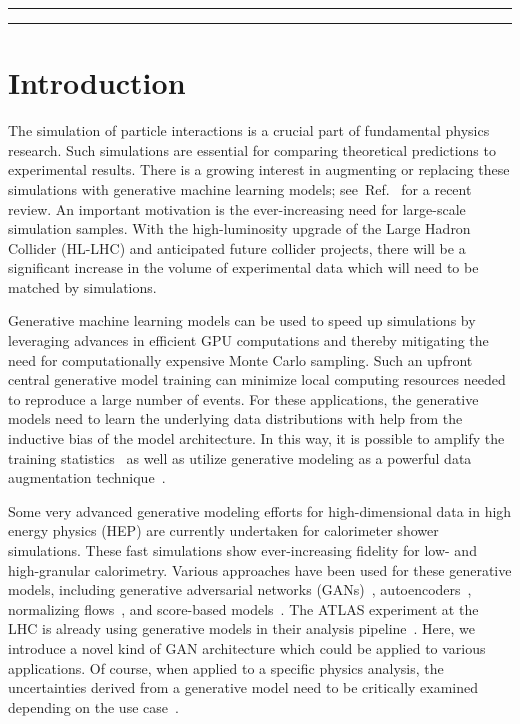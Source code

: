 \documentclass[a4paper,submission, Phys]{SciPost}
\DeclareRobustCommand{\Reff}[1]{Ref.~\cite{#1}}
\begin{document}
\vspace{10pt}
\noindent\rule{\textwidth}{1pt}
\setcounter{tocdepth}{2} 
\tableofcontents\thispagestyle{fancy}
\noindent\rule{\textwidth}{1pt}
\vspace{10pt}


\section{Introduction}

The simulation of particle interactions is a crucial part of fundamental physics research.
%
Such simulations are essential for comparing theoretical predictions to experimental results.
%
There is a growing interest in augmenting or replacing these simulations with generative machine learning models; see~\Reff{MLandtheLHCeventGeneration} for a recent review.
%
An important motivation is the ever-increasing need for large-scale simulation samples.
%
With the high-luminosity upgrade of the Large Hadron Collider (HL-LHC) and anticipated future collider projects, there will be a significant increase in the volume of experimental data which will need to be matched by simulations.


Generative machine learning models can be used to speed up simulations by leveraging advances in efficient GPU computations and thereby mitigating the need for computationally expensive Monte Carlo sampling.
%
Such an upfront central generative model training can minimize local computing resources needed to reproduce a large number of events.
%
For these applications, the generative models need to learn the underlying data distributions with help from the inductive bias of the model architecture.
%
In this way, it is possible to amplify the training statistics~\cite{Butter_2021_GANplify, Bieringer_2022_Calomplify} as well as utilize generative modeling as a powerful data augmentation technique~\cite{Kummer_2022_RadioGalaxiesClassification}.


Some very advanced generative modeling efforts for high-dimensional data in high energy physics (HEP) are currently undertaken for calorimeter shower simulations.
%
These fast simulations show ever-increasing fidelity for low- and high-granular calorimetry.
%
Various approaches have been used for these generative models, including generative adversarial networks (GANs)~\cite{CaloGAN, Vallecorsa2019_3dconvolutional,Erdmann_2019,
khattak2021fast, atlascollaboration2022deep, ATLAS_FastGen}, 
autoencoders~\cite{BIB-AE, decoding_photons, hadrons_better, cresswell2022caloman}, 
normalizing flows~\cite{CaloFlow1, CaloFlow2}, 
and score-based models~\cite{CaloScore}.
%
The ATLAS experiment at the LHC is already using generative models in their analysis pipeline~\cite{ATLAS_FastGen}. 
% 
Here, we introduce a novel kind of GAN architecture which could be applied to various applications. 
% 
Of course, when applied to a specific physics analysis, the uncertainties derived from a generative model need to be critically examined depending on the use case~\cite{Matchev_2022}.
\end{document}
